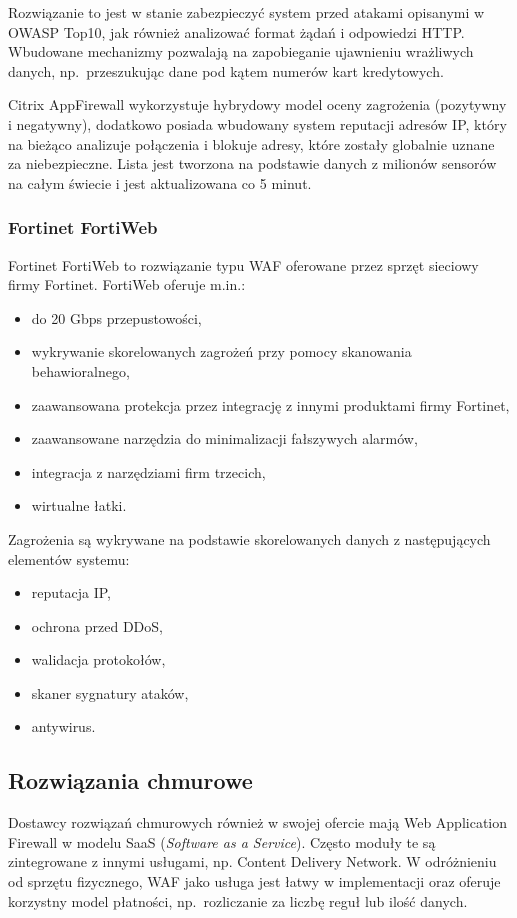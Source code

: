 \documentclass[11pt,a4paper,polish,thesis]{dcsbook}
\begin{document}
Rozwiązanie to jest w stanie zabezpieczyć system przed atakami opisanymi w OWASP Top10, jak również analizować format żądań i odpowiedzi HTTP. Wbudowane mechanizmy pozwalają na zapobieganie ujawnieniu wrażliwych danych, np.~przeszukując dane pod kątem numerów kart kredytowych.

Citrix AppFirewall wykorzystuje hybrydowy model oceny zagrożenia (pozytywny i negatywny), dodatkowo posiada wbudowany system reputacji adresów IP, który na bieżąco analizuje połączenia i blokuje adresy, które zostały globalnie uznane za niebezpieczne. Lista jest tworzona na podstawie danych z milionów sensorów na całym świecie i jest aktualizowana co 5 minut.

\subsubsection{Fortinet FortiWeb}
Fortinet FortiWeb \cite{fortiweb} to rozwiązanie typu WAF oferowane przez sprzęt sieciowy firmy Fortinet. FortiWeb oferuje m.in.:
\begin{itemize}
\item do 20 Gbps przepustowości,
\item wykrywanie skorelowanych zagrożeń przy pomocy skanowania behawioralnego,
\item zaawansowana protekcja przez integrację z innymi produktami firmy Fortinet,
\item zaawansowane narzędzia do minimalizacji fałszywych alarmów,
\item integracja z narzędziami firm trzecich,
\item wirtualne łatki.
\end{itemize}

Zagrożenia są wykrywane na podstawie skorelowanych danych z następujących elementów systemu:
\begin{itemize}
\item reputacja IP,
\item ochrona przed DDoS,
\item walidacja protokołów,
\item skaner sygnatury ataków,
\item antywirus.
\end{itemize}

\subsection{Rozwiązania chmurowe}
Dostawcy rozwiązań chmurowych również w swojej ofercie mają Web Application Firewall w modelu SaaS (\textit{Software as a Service}). Często moduły te są zintegrowane z innymi usługami, np. Content Delivery Network. W odróżnieniu od sprzętu fizycznego, WAF jako usługa jest łatwy w implementacji oraz oferuje korzystny model płatności, np.~rozliczanie za liczbę reguł lub ilość danych.
\end{document}
